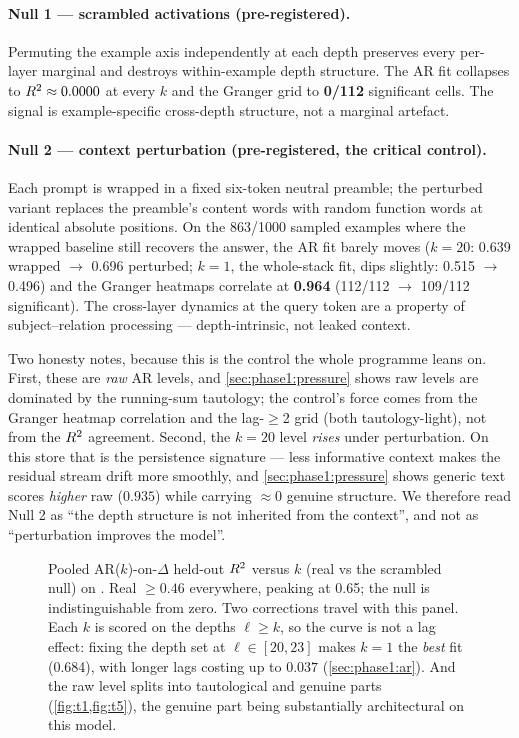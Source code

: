 \paragraph{Null 1 --- scrambled activations (pre-registered).}
Permuting the example axis independently at each depth preserves every
per-layer marginal and destroys within-example depth structure. The AR fit
collapses to $R^2 \approx 0.0000$ at every $k$ and the Granger grid to
\textbf{0/112} significant cells. The signal is example-specific cross-depth
structure, not a marginal artefact.

\paragraph{Null 2 --- context perturbation (pre-registered, the critical
control).}
Each prompt is wrapped in a fixed six-token neutral preamble; the perturbed
variant replaces the preamble's content words with random function words at
identical absolute positions. On the 863/1000 sampled examples where the
wrapped baseline still recovers the answer, the AR fit barely moves
($k{=}20$: 0.639 wrapped $\to$ 0.696 perturbed; $k{=}1$, the whole-stack fit,
dips slightly: 0.515 $\to$ 0.496) and the Granger heatmaps correlate at
\textbf{0.964} (112/112 $\to$ 109/112 significant). The cross-layer dynamics
at the query token are a property of subject--relation processing ---
depth-intrinsic, not leaked context.

Two honesty notes, because this is the control the whole programme leans on.
First, these are \emph{raw} AR levels, and \cref{sec:phase1:pressure} shows raw
levels are dominated by the running-sum tautology; the control's force comes
from the Granger heatmap correlation and the lag-$\ge$2 grid (both
tautology-light), not from the $R^2$ agreement. Second, the $k{=}20$ level
\emph{rises} under perturbation. On this store that is the persistence
signature --- less informative context makes the residual stream drift more
smoothly, and \cref{sec:phase1:pressure} shows generic text scores
\emph{higher} raw ($0.935$) while carrying $\approx0$ genuine structure. We
therefore read Null 2 as ``the depth structure is not inherited from the
context'', and not as ``perturbation improves the model''.

\begin{figure}[t]
  \centering
  
  \caption{Pooled AR($k$)-on-$\Delta$ held-out $R^2$ versus $k$ (real vs the
  scrambled null) on \pythia{}. Real $\ge 0.46$ everywhere, peaking at 0.65;
  the null is indistinguishable from zero. Two corrections travel with this
  panel. Each $k$ is scored on the depths $\ell \ge k$, so the curve is not a
  lag effect: fixing the depth set at $\ell \in [20,23]$ makes $k{=}1$ the
  \emph{best} fit (0.684), with longer lags costing up to $0.037$
  (\cref{sec:phase1:ar}). And the raw level splits into tautological and
  genuine parts (\cref{fig:t1,fig:t5}), the genuine part being substantially
  architectural on this model.}
  \label{fig:h1-ar}
\end{figure}

